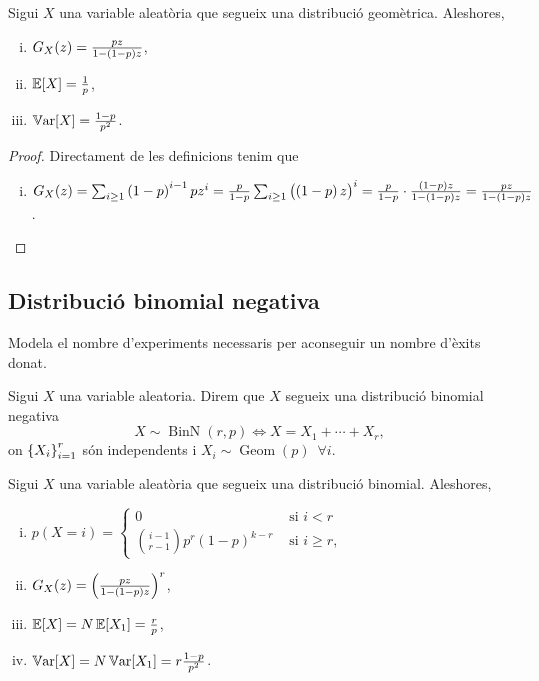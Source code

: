 \begin{prop}
    Sigui $X$ una variable aleatòria que segueix una distribució geomètrica. Aleshores,
    \begin{enumerate}[i)]
        \item $G_X(z) =  \frac{pz}{1-\left( 1-p\right) z}$,
        \item $\operatorname{\mathbb{E}}[X] = \frac{1}{p}$,
        \item $\operatorname{\mathbb{V}ar}[X] = \frac{1-p}{p^2}$.
    \end{enumerate}
\end{prop}
\begin{proof}
  Directament de les definicions tenim que
  \begin{enumerate}[i)]
   \item $G_X(z) = \sum_{i\geq 1}\left( 1-p \right) ^{i-1}p z^i = \frac{p}{1-p}\sum_{i\geq 1}\left(\left( 1-p \right) z\right)^{i} = 
   \frac{p}{1-p}\cdot\frac{\left( 1-p \right) z}{1-\left( 1-p\right) z}= \frac{pz}{1-\left( 1-p\right) z}$.
  \end{enumerate}
\end{proof}

\subsection*{Distribució binomial negativa}
Modela el nombre d'experiments necessaris per aconseguir un nombre d'èxits donat.

\begin{defi}
  Sigui $X$ una variable aleatoria. Direm que $X$ segueix una distribució binomial negativa
    \[X \sim \operatorname{BinN}(r,p) \iff X = X_1 + \cdots + X_r,\]
    on $\left\{ X_i \right\}_{i=1}^{r}$ són independents i $X_i \sim \operatorname{Geom}(p) \enspace\forall i$.
\end{defi}

\begin{prop}
    Sigui $X$ una variable aleatòria que segueix una distribució binomial. Aleshores,
    \begin{enumerate}[i)]
        \item $p(X=i) = \begin{cases}
                         0 &\text{ si } i< r\\
                         \binom{i-1}{r-1}p^{r}(1-p)^{k-r} & \text{ si }i\geq r,
                        \end{cases}$
        \item $G_X(z) = \left( \frac{pz}{1-\left( 1-p\right) z}\right)^r$,
        \item $\operatorname{\mathbb{E}}[X] = N\operatorname{\mathbb{E}}[X_1] = \frac{r}{p}$,
        \item $\operatorname{\mathbb{V}ar}[X] = N\operatorname{\mathbb{V}ar}[X_1] = r\frac{1-p}{p^2}$.
    \end{enumerate}
\end{prop}


